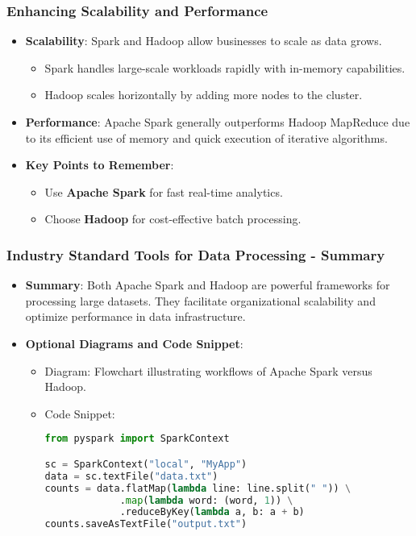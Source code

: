 \documentclass[aspectratio=169]{beamer}
\begin{document}
\begin{frame}[fragile]
    \frametitle{Enhancing Scalability and Performance}
    \begin{itemize}
        \item \textbf{Scalability}:
        Spark and Hadoop allow businesses to scale as data grows. 
        \begin{itemize}
            \item Spark handles large-scale workloads rapidly with in-memory capabilities.
            \item Hadoop scales horizontally by adding more nodes to the cluster.
        \end{itemize}
        
        \item \textbf{Performance}:
        Apache Spark generally outperforms Hadoop MapReduce due to its efficient use of memory and quick execution of iterative algorithms.
        
        \item \textbf{Key Points to Remember}:
        \begin{itemize}
            \item Use \textbf{Apache Spark} for fast real-time analytics.
            \item Choose \textbf{Hadoop} for cost-effective batch processing.
        \end{itemize}
    \end{itemize}
\end{frame}

\begin{frame}[fragile]
    \frametitle{Industry Standard Tools for Data Processing - Summary}
    \begin{itemize}
        \item \textbf{Summary}:
        Both Apache Spark and Hadoop are powerful frameworks for processing large datasets. They facilitate organizational scalability and optimize performance in data infrastructure.
        
        \item \textbf{Optional Diagrams and Code Snippet}:
        \begin{itemize}
            \item Diagram: Flowchart illustrating workflows of Apache Spark versus Hadoop.
            \item Code Snippet:
            \begin{lstlisting}[language=Python]
from pyspark import SparkContext

sc = SparkContext("local", "MyApp")
data = sc.textFile("data.txt")
counts = data.flatMap(lambda line: line.split(" ")) \
             .map(lambda word: (word, 1)) \
             .reduceByKey(lambda a, b: a + b)
counts.saveAsTextFile("output.txt")
            \end{lstlisting}
        \end{itemize}
    \end{itemize}
\end{frame}
\end{document}

